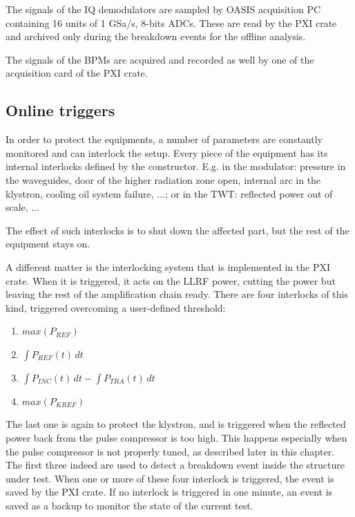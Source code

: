 The signals of the IQ demodulators are sampled by OASIS acquisition PC containing 16 units of 1 GSa/s, 8-bits ADCs. These are read by the PXI crate and archived only during the breakdown events for the offline analysis. 

The signals of the BPMs are acquired and recorded as well by one of the acquisition card of the PXI crate.








\subsection[Online triggers]{Online triggers}

In order to protect the equipments, a number of parameters are constantly monitored and can interlock the setup. Every piece of the equipment has its internal interlocks defined by the constructor. E.g. in the modulator: pressure in the waveguides, door of the higher radiation zone open, internal arc in the klystron, cooling oil system failure, ...; or in the TWT: reflected power out of scale, ... 

The effect of such interlocks is to shut down the affected part, but the rest of the equipment stays on.

A different matter is the interlocking system that is implemented in the PXI crate. When it is triggered, it acts on the LLRF power, cutting the power but leaving the rest of the amplification chain ready. There are four interlocks of this kind, triggered overcoming a user-defined threshold:
\begin{enumerate}
\item { $max(P_{REF})$}
\item { $\int P_{REF}(t) \, dt $}
\item { $\int P_{INC}(t)\,dt - \int P_{TRA}(t)\,dt$}
\item { $max(P_{KREF})$}
\end{enumerate}
The last one is again to protect the klystron, and is triggered when the reflected power back from the pulse compressor is too high. This happens especially when the pulse compressor is not properly tuned, as described later in this chapter.
The first three indeed are used to detect a breakdown event inside the structure under test. When one or more of these four interlock is triggered, the event is saved by the PXI crate. If no interlock is triggered in one minute, an event is saved as a backup to monitor the state of the current test.

